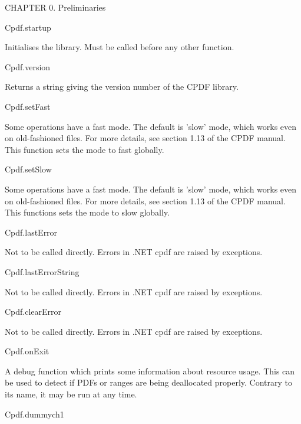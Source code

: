 CHAPTER 0. Preliminaries

Cpdf.startup

Initialises the library. Must be called before any other function.

Cpdf.version

Returns a string giving the version number of the CPDF library.

Cpdf.setFast

Some operations have a fast mode. The default is 'slow' mode, which works
even on old-fashioned files. For more details, see section 1.13 of the
CPDF manual. This function sets the mode to fast globally.

Cpdf.setSlow

Some operations have a fast mode. The default is 'slow' mode, which works
even on old-fashioned files. For more details, see section 1.13 of the
CPDF manual. This functions sets the mode to slow globally.

Cpdf.lastError

Not to be called directly. Errors in .NET cpdf are raised by exceptions.

Cpdf.lastErrorString

Not to be called directly. Errors in .NET cpdf are raised by exceptions.

Cpdf.clearError

Not to be called directly. Errors in .NET cpdf are raised by exceptions.

Cpdf.onExit

A debug function which prints some information about
resource usage. This can be used to detect if PDFs or ranges are being
deallocated properly. Contrary to its name, it may be run at any time.

Cpdf.dummych1

